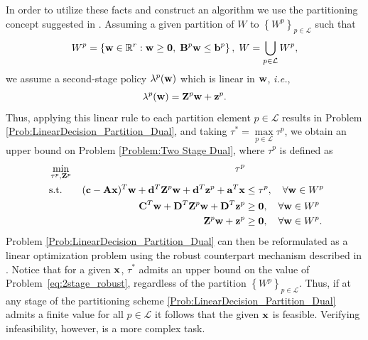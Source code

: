 \documentclass[12pt,x11names]{article}
\theoremstyle{definition}
\newcommand{\paren}[1]{\left\{ {#1} \right\}} %
\newcommand{\real}{\mathbb{R}} %
\newcommand{\ie}{{\em i.e.}, }
\newcommand{\bzero}{{\bf 0}}
\newcommand{\ba}{{\bf a}}
\newcommand{\bb}{{\bf b}}
\newcommand{\bc}{{\bf c}}
\newcommand{\bd}{{\bf d}}
\newcommand{\bw}{{\bf w}}
\newcommand{\bx}{{\bf x}}
\newcommand{\bz}{{\bf z}}
\newcommand{\bba}{{\bf A}}
\newcommand{\bbb}{{\bf B}}
\newcommand{\bbc}{{\bf C}}
\newcommand{\bbd}{{\bf D}}
\newcommand{\bbz}{{\bf Z}}
\begin{document}
In order to utilize these facts and construct an algorithm we use the partitioning concept suggested in \citep{BertsimasDunning2014,PostekDenHertog2014}. Assuming a given partition of $W$ to $\paren{W^p}_{p\in\mathcal{L}}$ such that $$W^p=\paren{\bw\in\real^r: \bw\geq \bzero,\; \bbb^p\bw\leq\bb^p},\; W=\bigcup\limits_{p\in\mathcal{L}} W^p,$$ we assume a second-stage policy $\lambda^p(\bw)$ which is linear in $\bw$, \ie
$$\lambda^p(\bw)=\bbz^p\bw+\bz^p.$$
Thus, applying this linear rule to each partition element $p\in\mathcal{L}$ results in Problem  \eqref{Prob:LinearDecision_Partition_Dual}, and taking $\tau^*=\max\limits_{p\in\mathcal{L}} \tau^p$, we obtain an upper bound on Problem \eqref{Problem:Two Stage Dual}, where $\tau^p$ is defined as
\begin{equation}\label{Prob:LinearDecision_Partition_Dual}
\begin{aligned}[t]
&\min_{\tau^p,\bbz^p} &\tau^p&\\
&\text{s.t.}\quad &(\bc-\bba\bx)^T\bw +\bd^T\bbz^p\bw+\bd^T\bz^p+\ba^T\bx&\leq \tau^p,\quad\forall \bw\in W^p\\\
&&\bbc^T\bw+\bbd^T\bbz^p\bw+\bbd^T\bz^p&\geq \bzero,\quad\forall \bw\in W^p\\
&&\bbz^p\bw+\bz^p&\geq \bzero,\quad\forall \bw\in W^p.\\
\end{aligned}
\end{equation}
Problem \eqref{Prob:LinearDecision_Partition_Dual} can then be reformulated as a linear optimization problem using the robust counterpart mechanism described in \citep{BenTal2009}.
Notice that for a given $\bx$, $\tau^*$ admits an upper bound on the value of Problem~\eqref{eq:2stage_robust}, regardless of the partition $\paren{W^p}_{p\in\mathcal{L}}$. Thus, if at any stage of the partitioning scheme \eqref{Prob:LinearDecision_Partition_Dual} admits a finite value for all $p\in\mathcal{L}$ it follows that the given $\bx$ is feasible. Verifying infeasibility, however, is a more complex task. 
\end{document}
